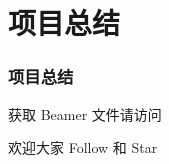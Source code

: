 \documentclass[aspectratio=169,12pt]{beamer}
\begin{document}
\section{项目总结}
\begin{frame}
	\frametitle{项目总结}
\end{frame}

\makebackcover

\begin{frame}
	
	\vspace{-5bp}
	\begin{flushleft}
	获取 Beamer 文件请访问 \href{https://github.com/Tang1705/BJTU-Graduation-Design-2021}{\faGithub}
	\newline

	欢迎大家 Follow 和 Star
	\end{flushleft}
\end{frame}
\end{document}

